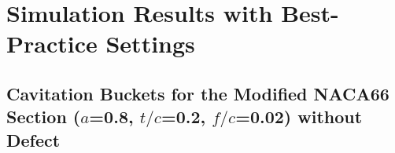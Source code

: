 \documentclass[onecolumn,11pt]{report}
\begin{document}



\section{Simulation Results with Best-Practice Settings}

\subsection{Cavitation Buckets for the Modified NACA66 Section ($a$=0.8, $t/c$=0.2, $f/c$=0.02) without Defect}
\end{document}
